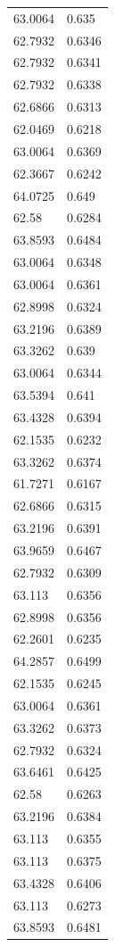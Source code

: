 \begin{longtable}{@{}ll@{}}
	63.0064  & 0.635   \\
	62.7932  & 0.6346  \\
	62.7932  & 0.6341  \\
	62.7932  & 0.6338  \\
	62.6866  & 0.6313  \\
	62.0469  & 0.6218  \\
	63.0064  & 0.6369  \\
	62.3667  & 0.6242  \\
	64.0725  & 0.649   \\
	62.58    & 0.6284  \\
	63.8593  & 0.6484  \\
	63.0064  & 0.6348  \\
	63.0064  & 0.6361  \\
	62.8998  & 0.6324  \\
	63.2196  & 0.6389  \\
	63.3262  & 0.639   \\
	63.0064  & 0.6344  \\
	63.5394  & 0.641   \\
	63.4328  & 0.6394  \\
	62.1535  & 0.6232  \\
	63.3262  & 0.6374  \\
	61.7271  & 0.6167  \\
	62.6866  & 0.6315  \\
	63.2196  & 0.6391  \\
	63.9659  & 0.6467  \\
	62.7932  & 0.6309  \\
	63.113   & 0.6356  \\
	62.8998  & 0.6356  \\
	62.2601  & 0.6235  \\
	64.2857  & 0.6499  \\
	62.1535  & 0.6245  \\
	63.0064  & 0.6361  \\
	63.3262  & 0.6373  \\
	62.7932  & 0.6324  \\
	63.6461  & 0.6425  \\
	62.58    & 0.6263  \\
	63.2196  & 0.6384  \\
	63.113   & 0.6355  \\
	63.113   & 0.6375  \\
	63.4328  & 0.6406  \\
	63.113   & 0.6273  \\
	63.8593  & 0.6481  \\

\end{longtable}
